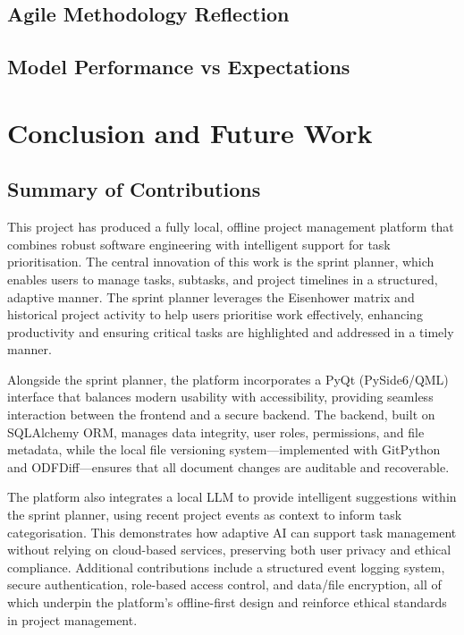 \documentclass{report}
\begin{document}
\section{Agile Methodology Reflection}
\section{Model Performance vs Expectations}

\chapter{Conclusion and Future Work}  %
\section{Summary of Contributions}
This project has produced a fully local, offline project management platform that combines robust software engineering with intelligent support for task prioritisation. The central innovation of this work is the sprint planner, which enables users to manage tasks, subtasks, and project timelines in a structured, adaptive manner. The sprint planner leverages the Eisenhower matrix and historical project activity to help users prioritise work effectively, enhancing productivity and ensuring critical tasks are highlighted and addressed in a timely manner.

Alongside the sprint planner, the platform incorporates a PyQt (PySide6/QML) interface that balances modern usability with accessibility, providing seamless interaction between the frontend and a secure backend. The backend, built on SQLAlchemy ORM, manages data integrity, user roles, permissions, and file metadata, while the local file versioning system—implemented with GitPython and ODFDiff—ensures that all document changes are auditable and recoverable.

The platform also integrates a local LLM to provide intelligent suggestions within the sprint planner, using recent project events as context to inform task categorisation. This demonstrates how adaptive AI can support task management without relying on cloud-based services, preserving both user privacy and ethical compliance. Additional contributions include a structured event logging system, secure authentication, role-based access control, and data/file encryption, all of which underpin the platform's offline-first design and reinforce ethical standards in project management.
\end{document}
